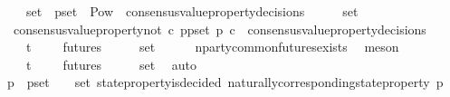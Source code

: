 \begin{isabellebody}
\ \ \ {\isachardoublequoteopen}{\isasymsigma}\ {\isasymin}\ {\isasymsigma}{\isacharunderscore}set\ {\isasymand}\ p{\isacharunderscore}set\ {\isasymin}\ Pow\ {\isacharparenleft}{\isasymUnion}\ {\isacharbraceleft}consensus{\isacharunderscore}value{\isacharunderscore}property{\isacharunderscore}decisions\ {\isasymsigma}{\isacharprime}\ {\isacharbar}\ {\isasymsigma}{\isacharprime}{\isachardot}\ {\isasymsigma}{\isacharprime}\ {\isasymin}\ {\isasymsigma}{\isacharunderscore}set{\isacharbraceright}{\isacharparenright}\ {\isacharminus}\ {\isasymemptyset}{\isachardoublequoteclose}\isanewline
\ \ \ {\isachardoublequoteopen}consensus{\isacharunderscore}value{\isacharunderscore}property{\isacharunderscore}not\ {\isacharparenleft}{\isasymlambda}c{\isachardot}\ {\isasymforall}p{\isasymin}p{\isacharunderscore}set{\isachardot}\ p\ c{\isacharparenright}\ {\isasymin}\ consensus{\isacharunderscore}value{\isacharunderscore}property{\isacharunderscore}decisions\ {\isasymsigma}{\isachardoublequoteclose}\isanewline
\ \ \isamarkupfalse%
\ {\isachardoublequoteopen}{\isasymexists}\ {\isasymsigma}{\isachardot}\ {\isasymsigma}\ {\isasymin}\ {\isasymSigma}t\ {\isasymand}\ {\isasymsigma}\ {\isasymin}\ {\isasymInter}\ {\isacharbraceleft}futures\ {\isasymsigma}\ {\isacharbar}\ {\isasymsigma}{\isachardot}\ {\isasymsigma}\ {\isasymin}\ {\isasymsigma}{\isacharunderscore}set{\isacharbraceright}{\isachardoublequoteclose}\isanewline
\ \ \ \ \isamarkupfalse%
\ n{\isacharunderscore}party{\isacharunderscore}common{\isacharunderscore}futures{\isacharunderscore}exists\ \isamarkupfalse%
\ meson\isanewline
\ \ \isamarkupfalse%
\ \isamarkupfalse%
\ {\isasymsigma}{\isacharprime}\ \ {\isachardoublequoteopen}{\isasymsigma}{\isacharprime}\ {\isasymin}\ {\isasymSigma}t\ {\isasymand}\ {\isasymsigma}{\isacharprime}\ {\isasymin}\ {\isasymInter}\ {\isacharbraceleft}futures\ {\isasymsigma}\ {\isacharbar}\ {\isasymsigma}{\isachardot}\ {\isasymsigma}\ {\isasymin}\ {\isasymsigma}{\isacharunderscore}set{\isacharbraceright}{\isachardoublequoteclose}\ \isamarkupfalse%
\ auto\isanewline
\ \ \isamarkupfalse%
\ {\isachardoublequoteopen}{\isasymforall}\ p\ {\isasymin}\ p{\isacharunderscore}set{\isachardot}\ {\isasymexists}\ {\isasymsigma}{\isacharprime}{\isacharprime}\ {\isasymin}\ {\isasymsigma}{\isacharunderscore}set{\isachardot}\ state{\isacharunderscore}property{\isacharunderscore}is{\isacharunderscore}decided\ {\isacharparenleft}naturally{\isacharunderscore}corresponding{\isacharunderscore}state{\isacharunderscore}property\ p{\isacharcomma}\ {\isasymsigma}{\isacharprime}{\isacharprime}{\isacharparenright}{\isachardoublequoteclose}\isanewline

\end{isabellebody}
